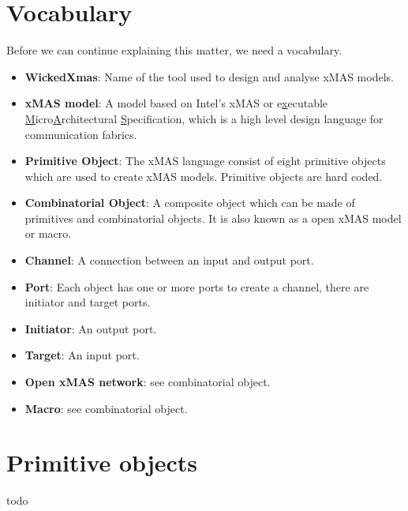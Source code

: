 \documentclass[a4paper,11pt,final]{article}
\begin{document}
\section{Vocabulary} 
Before we can continue explaining this matter, we need a vocabulary. 
\begin{itemize}
\item \textbf{WickedXmas}: Name of the tool used to design and analyse xMAS models.
\item \textbf{xMAS model}: A model based on Intel's xMAS or e\underline{x}ecutable \underline{M}icro\underline{A}rchitectural \underline{S}pecification, which is a high level design language for communication fabrics. 
\item \textbf{Primitive Object}: The xMAS language consist of eight primitive objects which are used to create xMAS models. Primitive objects are hard coded.
\item \textbf{Combinatorial Object}: A composite object which can be made of primitives and combinatorial objects. It is also known as a open xMAS model or macro.
\item \textbf{Channel}: A connection between an input and output port.
\item \textbf{Port}: Each object has one or more ports to create a channel, there are initiator and target ports.
\item \textbf{Initiator}: An output port.
\item \textbf{Target}: An input port.
\item \textbf{Open xMAS network}: see combinatorial object.
\item \textbf{Macro}: see combinatorial object.


\end{itemize}



\section{Primitive objects}
todo   
\end{document}
